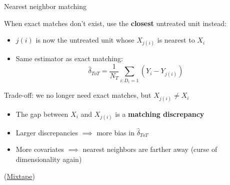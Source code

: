 \documentclass[compress, 8pt]{beamer}
\begin{document}
\begin{frame}{Nearest neighbor matching}

When exact matches don't exist, use the \textbf{closest} untreated unit instead:
\begin{itemize}
    \item $j(i)$ is now the untreated unit whose $X_{j(i)}$ is nearest to $X_i$
    \item Same estimator as exact matching:
    \begin{equation*}
        \hat{\delta}_{ToT} = \frac{1}{N_T} \sum_{i: D_i = 1} \left( Y_i - Y_{j(i)} \right)
    \end{equation*}
\end{itemize}

\vspace{2ex}
Trade-off: we no longer need exact matches, but $X_{j(i)} \neq X_i$
\begin{itemize}
    \item The gap between $X_i$ and $X_{j(i)}$ is a \textbf{matching discrepancy}
    \item Larger discrepancies $\implies$ more bias in $\hat{\delta}_{ToT}$
    \item More covariates $\implies$ nearest neighbors are farther away (curse of dimensionality again)
\end{itemize}
(\href{https://mixtape.scunning.com/05-causal_cross_sectional_designs\#minimizing-matching-discrepancies-with-nearest-neighbors}{Mixtape})

\end{frame}
\end{document}
